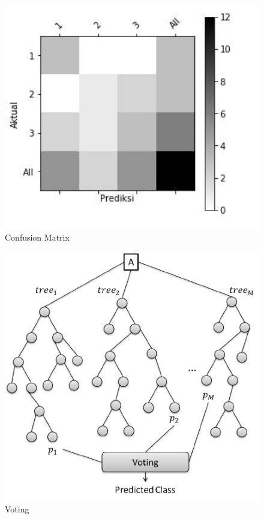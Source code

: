 \begin{figure}[ht]
	\centerline{\includegraphics[width=1\textwidth]{figures/huda/chapter3/3.JPG}}
	\caption{Confusion Matrix}
	\label{h3}
\end{figure}

\begin{figure}[ht]
	\centerline{\includegraphics[width=1\textwidth]{figures/huda/chapter3/4.png}}
	\caption{Voting}
	\label{h4}
\end{figure}

